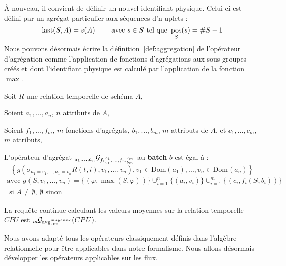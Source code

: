 À nouveau, il convient de définir un nouvel identifiant physique. Celui-ci est défini par un agrégat particulier aux séquences d'n-uplets : 
$$\mathrm{last}(S,A) = s(A) \qquad \textrm{ avec } s\in S \textrm{ tel que }\mathop{\mathrm{pos}}_{S}(s) = \#S-1$$
Nous pouvons désormais écrire la définition~\ref{def:aggregation} de l'opérateur d'agrégation comme l'application de fonctions d'agrégations aux sous-groupes créés et dont l'identifiant physique est calculé par l'application de la fonction $\max$.
\begin{defi}\label{def:aggregation}
    Soit $R$ une relation temporelle de schéma $A$,

    Soient $a_1,...,a_n$, $n$ attributs de $A$,

    Soient $f_1,...,f_m$, $m$ fonctions d'agrégats, $b_1,...,b_m$, $m$ attributs de $A$, et $c_1,...,c_m$, $m$ attributs,

    L'opérateur d'agrégat $_{a_1,...,a_n}\mathcal{G}_{{f_1}_{b_1}^{c_1},...,{f_m}_{b_m}^{c_m}}$ au \textbf{batch} $b$ est égal à :
$$\left\{g(\sigma_{a_1=v_1,...,a_1=v_n} R(t,i),v_1,...,v_n), v_1 \in \mathrm{Dom}(a_1), ..., v_n \in \mathrm{Dom}(a_n)\right\} $$
$$\begin{array}{c}\textrm{avec } g(S,v_1,...,v_n) = \{(\varphi,\max(S,\varphi))\}\cup_{i=1}^n \{(a_i, v_i)\} \cup_{i=1}^m \{(c_i,f_i(S,b_i))\}\\ \textrm{ si } A \neq \emptyset,\ \emptyset\textrm{ sinon}\end{array}$$
\end{defi}

\begin{example}
    La requête continue calculant les valeurs moyennes sur la relation temporelle $CPU$ est $_{id}\mathcal{G}_{\mathrm{avg}_{cpu}^{moyenne}}(CPU)$.
\end{example}

Nous avons adapté tous les opérateurs classiquement définis dans l'algèbre relationnelle pour être applicables dans notre formalisme. Nous allons désormais développer les opérateurs applicables sur les flux.
